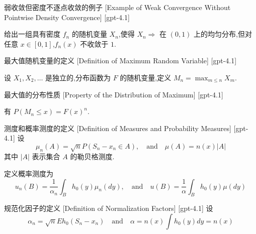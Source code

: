 \documentclass[UTF8]{ctexart}
\begin{document}
    
    
    \begin{xmp}
        {弱收敛但密度不逐点收敛的例子}
        [Example of Weak Convergence Without Pointwise Density Convergence]
        [gpt-4.1]
        
给出一组具有密度 $f_n$ 的随机变量 $X_n$,使得 $X_n \Rightarrow$ 在 $(0,1)$ 上的均匀分布,但对任意 $x \in [0, 1]$,$f_n(x)$ 不收敛于 $1$.

    \end{xmp}
    
    
    
    \begin{dfn}
        {最大值随机变量的定义}
        [Definition of Maximum Random Variable]
        [gpt-4.1]
        
设 $X_1,X_2,\dots$ 是独立的,分布函数为 $F$ 的随机变量,定义 $M_n = \max_{m \leq n} X_m$.

    \end{dfn}
    
    
    
    \begin{ppt}
        {最大值的分布性质}
        [Property of the Distribution of Maximum]
        [gpt-4.1]
        
有 $P(M_n \leq x) = F(x)^n$.

    \end{ppt}
    
    
    
    \begin{dfn}
        {测度和概率测度的定义}
        [Definition of Measures and Probability Measures]
        [gpt-4.1]
        设
\[
\mu_n(A) = \sqrt{n}P(S_n - x_n \in A), \quad \text{and} \quad \mu(A) = n(x)|A|
\]
其中 $|A|$ 表示集合 $A$ 的勒贝格测度.

定义概率测度为
\[
u_n(B) = \frac{1}{\alpha_n}\int_B h_0(y)\mu_n(dy), \quad \text{and} \quad 
u(B) = \frac{1}{\alpha}\int_B h_0(y)\mu(dy)
\]

    \end{dfn}
    
    
    
    \begin{dfn}
        {规范化因子的定义}
        [Definition of Normalization Factors]
        [gpt-4.1]
        设
\[
\alpha_n = \sqrt{n}E h_0(S_n - x_n) \quad \text{and} \quad \alpha = n(x) \int h_0(y)dy = n(x)
\]

    \end{dfn}
    
\end{document}
